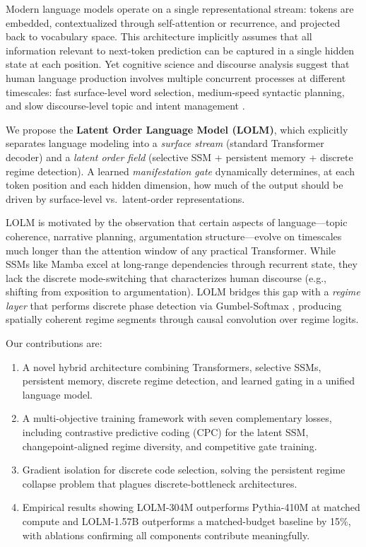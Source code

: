 \documentclass{article}
\begin{document}
Modern language models operate on a single representational stream: tokens are
embedded, contextualized through self-attention or recurrence, and projected
back to vocabulary space. This architecture implicitly assumes that all
information relevant to next-token prediction can be captured in a single hidden
state at each position. Yet cognitive science and discourse analysis suggest
that human language production involves multiple concurrent processes at
different timescales: fast surface-level word selection, medium-speed syntactic
planning, and slow discourse-level topic and intent management
\citep{pickering2004toward,kintsch1998comprehension}.

We propose the \textbf{Latent Order Language Model (LOLM)}, which explicitly
separates language modeling into a \emph{surface stream} (standard Transformer
decoder) and a \emph{latent order field} (selective SSM + persistent memory +
discrete regime detection). A learned \emph{manifestation gate} dynamically
determines, at each token position and each hidden dimension, how much of the
output should be driven by surface-level vs.\ latent-order representations.

LOLM is motivated by the observation that certain aspects of language---topic
coherence, narrative planning, argumentation structure---evolve on timescales
much longer than the attention window of any practical Transformer. While SSMs
like Mamba \citep{gu2023mamba} excel at long-range dependencies through
recurrent state, they lack the discrete mode-switching that characterizes human
discourse (e.g., shifting from exposition to argumentation). LOLM bridges this
gap with a \emph{regime layer} that performs discrete phase detection via
Gumbel-Softmax \citep{jang2016categorical}, producing spatially coherent regime
segments through causal convolution over regime logits.

Our contributions are:
\begin{enumerate}
    \item A novel hybrid architecture combining Transformers, selective SSMs,
    persistent memory, discrete regime detection, and learned gating in a
    unified language model.
    \item A multi-objective training framework with seven complementary losses,
    including contrastive predictive coding (CPC) for the latent SSM,
    changepoint-aligned regime diversity, and competitive gate training.
    \item Gradient isolation for discrete code selection, solving the persistent
    regime collapse problem that plagues discrete-bottleneck architectures.
    \item Empirical results showing LOLM-304M outperforms Pythia-410M at
    matched compute and LOLM-1.57B outperforms a matched-budget baseline by
    15\%, with ablations confirming all components contribute meaningfully.
\end{enumerate}
\end{document}
